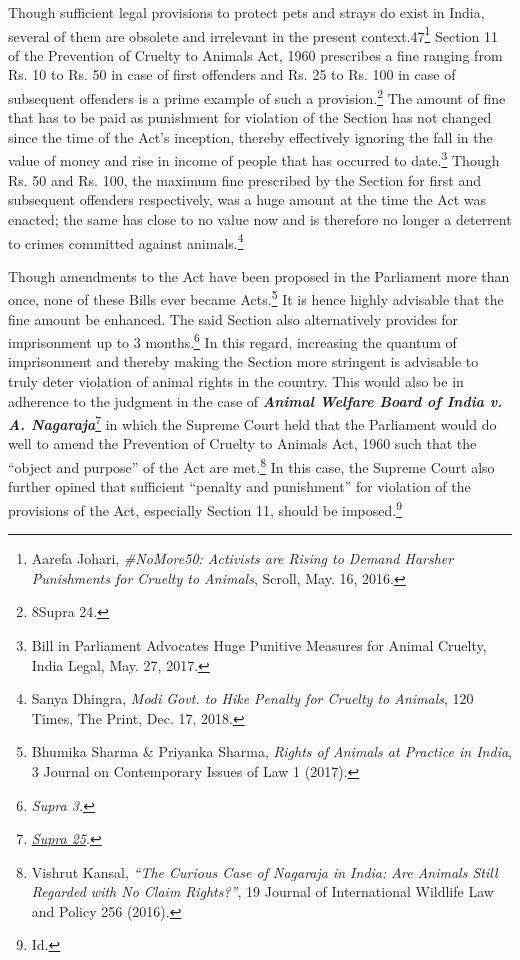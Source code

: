 \begin{multicols}{2}
\noi
Though sufficient legal provisions to protect pets and strays do exist in India, several of them
are obsolete and irrelevant in the present context.47\footnote{Aarefa Johari, \textit{\#NoMore50: Activists are Rising to Demand Harsher Punishments for Cruelty to Animals}, Scroll, May. 16, 2016. } Section 11 of the Prevention of Cruelty to
Animals Act, 1960 prescribes a fine ranging from Rs. 10 to Rs. 50 in case of first offenders
and Rs. 25 to Rs. 100 in case of subsequent offenders is a prime example of such a
provision.\footnote{8Supra 24.} The amount of fine that has to be paid as punishment for violation of the Section
has not changed since the time of the Act’s inception, thereby effectively ignoring the fall in
the value of money and rise in income of people that has occurred to date.\footnote{Bill in Parliament Advocates Huge Punitive Measures for Animal Cruelty, India Legal, May. 27, 2017.} Though Rs. 50
and Rs. 100, the maximum fine prescribed by the Section for first and subsequent offenders
respectively, was a huge amount at the time the Act was enacted; the same has close to no
value now and is therefore no longer a deterrent to crimes committed against animals.\footnote{Sanya Dhingra, \textit{Modi Govt. to Hike Penalty for Cruelty to Animals}, 120 Times, The Print, Dec. 17, 2018.}

\noi
Though amendments to the Act have been proposed in the Parliament more than once, none
of these Bills ever became Acts.\footnote{Bhumika Sharma \& Priyanka Sharma, \textit{Rights of Animals at Practice in India}, 3 Journal on Contemporary
Issues of Law 1 (2017).} It is hence highly advisable that the fine amount be
enhanced. The said Section also alternatively provides for imprisonment up to 3 months.\footnote{\textit{Supra 3.}} In
this regard, increasing the quantum of imprisonment and thereby making the Section more
stringent is advisable to truly deter violation of animal rights in the country. This would also
be in adherence to the judgment in the case of {\it {\bfseries Animal Welfare Board of India v. A.
Nagaraja}}\footnote{\underline{{\it Supra 25}}.} in which the Supreme Court held that the Parliament would do well to amend the Prevention of Cruelty to Animals Act, 1960 such that the “object and purpose” of the Act are
met.\footnote{Vishrut Kansal, \textit{“The Curious Case of Nagaraja in India: Are Animals Still Regarded with No Claim Rights?”},
19 Journal of International Wildlife Law and Policy 256 (2016).} In this case, the Supreme Court also further opined that sufficient “penalty and
punishment” for violation of the provisions of the Act, especially Section 11, should be
imposed.\footnote{Id.}


\end{multicols}
